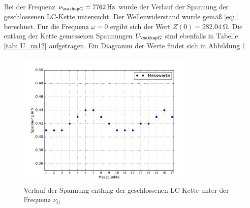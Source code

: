 Bei der Frequenz $\nu\ua{G} = \SI{7762}{\hertz}$ wurde der Verlauf der Spannung der geschlossenen LC-Kette untersucht. Der Wellenwiderstand
wurde gemäß \eqref{eq: } berechnet. Für die Frequenz $\omega = 0$ ergibt sich der Wert $Z(0) = \SI{282.04}{\ohm}$. Die entlang der Kette gemessenen
Spannungen $U\ua{G}$ sind ebenfalls in Tabelle \ref{tab: U_nu12} aufgetragen. Ein Diagramm der Werte findet sich in Abbildung \ref{fig: U_G}
\begin{figure}
  \centering
  \includegraphics[width = 0.8\textwidth]{../Messdaten/plots/spannungsverlauf_geschlossen.pdf}
  \caption{Verlauf der Spannung entlang der geschlossenen LC-Kette unter der Frequenz $\nu_G$}
  \label{fig: U_G}
\end{figure}
